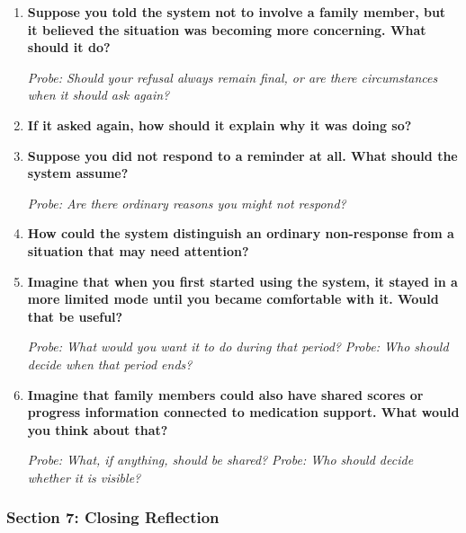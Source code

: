 \begin{enumerate}[resume]
  \item \textbf{Suppose you told the system not to involve a family member, but it believed the situation was becoming more concerning. What should it do?}

  \textit{Probe: Should your refusal always remain final, or are there circumstances when it should ask again?}
  \item \textbf{If it asked again, how should it explain why it was doing so?}
  \item \textbf{Suppose you did not respond to a reminder at all. What should the system assume?}

  \textit{Probe: Are there ordinary reasons you might not respond?}
  \item \textbf{How could the system distinguish an ordinary non-response from a situation that may need attention?}
  \item \textbf{Imagine that when you first started using the system, it stayed in a more limited mode until you became comfortable with it. Would that be useful?}

  \textit{Probe: What would you want it to do during that period?} \textit{Probe: Who should decide when that period ends?}
  \item \textbf{Imagine that family members could also have shared scores or progress information connected to medication support. What would you think about that?}

  \textit{Probe: What, if anything, should be shared?} \textit{Probe: Who should decide whether it is visible?}
\end{enumerate}

\subsubsection{Section 7: Closing Reflection}

